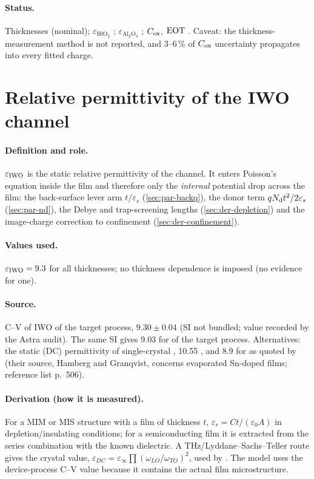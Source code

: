 \paragraph{Status.}
Thicknesses  (nominal); $\varepsilon_{\mathrm{HfO_2}}$
; $\varepsilon_{\mathrm{Al_2O_3}}$ ; $C_{\mathrm{ox}}$, $\mathrm{EOT}$
. Caveat: the thickness-measurement method is not reported, and 3--6\,\% of $C_{\mathrm{ox}}$
uncertainty propagates into every fitted charge.

\section{Relative permittivity of the IWO channel}
\label{sec:par-eps-iwo}

\paragraph{Definition and role.}
$\varepsilon_{\mathrm{IWO}}$ is the static relative permittivity of the channel. It enters Poisson's equation inside the film
and therefore only the \emph{internal} potential drop across the film: the back-surface lever arm
$t/\varepsilon_s$ (\cref{sec:par-backq}), the donor term $qN_{\mathrm{d}} t^2/2\varepsilon_s$ (\cref{sec:par-nd}), the
Debye and trap-screening lengths (\cref{sec:der-depletion}) and the image-charge correction to
confinement (\cref{sec:der-confinement}).

\paragraph{Values used.}
$\varepsilon_{\mathrm{IWO}} = 9.3$ for all thicknesses; no thickness dependence is imposed (no evidence for one).

\paragraph{Source.}
C--V of IWO of the target process, $9.30\pm0.04$ \citep[SI Fig.~S1b]{JanuarSI2026} (SI not bundled; value
recorded by the Astra audit). The same SI gives 9.03 for \InO{} of the target process. Alternatives: the
static (DC) permittivity of single-crystal \InO{}, 10.55 \citep[p.~225102-12]{Stokey2021}, and 8.9 for
\InO{} as quoted by \citet[p.~501]{Si2021} (their source, Hamberg and Granqvist, concerns evaporated Sn-doped \InO{}
films; reference list p.~506).

\paragraph{Derivation (how it is measured).}
For a MIM or MIS structure with a film of thickness $t$, $\varepsilon_r = C t/(\varepsilon_0 A)$ in
depletion/insulating conditions; for a semiconducting film it is extracted from the series combination
with the known dielectric. A THz/Lyddane--Sachs--Teller route gives the crystal value,
$\varepsilon_{DC} = \varepsilon_\infty\prod(\omega_{LO}/\omega_{TO})^2$, used by \citet[p.~225102-12]{Stokey2021}.
The model uses the device-process C--V value because it contains the actual film microstructure.

